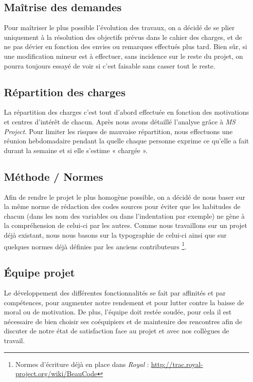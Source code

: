 \documentclass[etudiants]{support-iutrs}
\begin{document}
\subsection{Maîtrise des demandes}

Pour maîtriser le plus possible l'évolution des travaux, on a décidé de se plier uniquement à la résolution des objectifs prévus dans le cahier des charges, et de ne pas dévier en fonction des envies ou remarques effectués plus tard.
Bien sûr, si une modification mineur est à effectuer, sans incidence sur le reste du projet, on pourra toujours essayé de voir si c'est faisable sans casser tout le reste.

\subsection{Répartition des charges}

La répartition des charges c'est tout d'abord effectuée en fonction des motivations et centres d'intérêt de chacun. 
Après nous avons détaillé l'analyse grâce à \emph{MS Project}.
Pour limiter les risques de mauvaise répartition, nous effectuons une réunion hebdomadaire pendant la quelle chaque personne exprime ce qu'elle a fait durant la semaine et si elle s'estime « chargée ». 

\subsection{Méthode \slash{} Normes}

Afin de rendre le projet le plus homogène possible, on a décidé de nous baser sur la même norme de rédaction des codes sources pour éviter que les habitudes de chacun (dans les nom des variables ou dans l'indentation par exemple) ne gène à la compréhension de celui-ci par les autres.
Comme nous travaillons sur un projet déjà existant, nous nous basons sur la typographie de celui-ci ainsi que sur quelques normes déjà définies par les anciens contributeurs 
\footnote{Normes d'écriture déjà en place dans \emph{Royal} : \url{http://trac.royal-project.org/wiki/BeauCode}}. 

\subsection{Équipe projet}

Le développement des différentes fonctionnalités se fait par affinités et par compétences, pour augmenter notre rendement et pour lutter contre la baisse de moral ou de motivation. De plus, l'équipe doit restée soudée, pour cela il est nécessaire de bien choisir ses coéquipiers et de maintenire des rencontres afin de discuter de notre état de satisfaction face au projet et avec nos collègues de travail.
\end{document}
